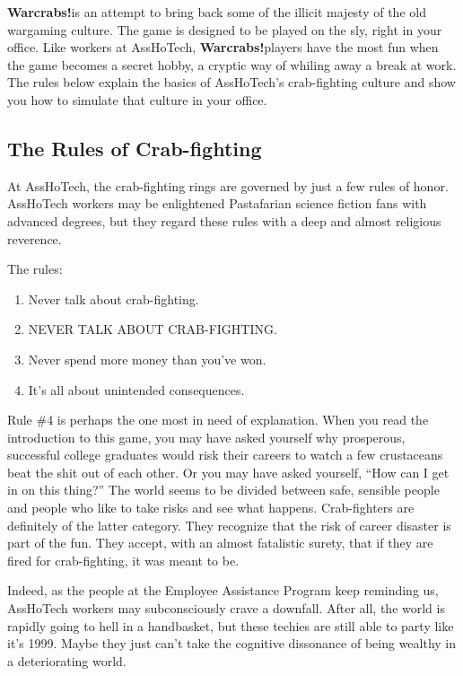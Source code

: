 \documentclass[a4paper,10pt]{article}
\newcommand{\warcrabs}{\textbf{Warcrabs!}}
\begin{document}
\warcrabs\hspace*{4pt}is an attempt to bring back some of the illicit majesty of the old wargaming culture. The game is designed to be played on the sly, right in your office. Like workers at AssHoTech, \warcrabs\hspace*{4pt}players have the most fun when the game becomes a secret hobby, a cryptic way of whiling away a break at work. The rules below explain the basics of AssHoTech's crab-fighting culture and show you how to simulate that culture in your office.

\subsection*{The Rules of Crab-fighting}
\label{sec:TheRulesofCrabfighting}
At AssHoTech, the crab-fighting rings are governed by just a few rules of honor. AssHoTech workers may be enlightened Pastafarian science fiction fans with advanced degrees, but they regard these rules with a deep and almost religious reverence.

The rules:

\begin{enumerate}
 \item Never talk about crab-fighting.
 \item NEVER TALK ABOUT CRAB-FIGHTING.
 \item Never spend more money than you've won.
 \item It's all about unintended consequences.
\end{enumerate}

Rule \#4 is perhaps the one most in need of explanation. When you read the introduction to this game, you may have asked yourself why prosperous, successful college graduates would risk their careers to watch a few crustaceans beat the shit out of each other. Or you may have asked yourself, ``How can I get in on this thing?'' The world seems to be divided between safe, sensible people and people who like to take risks and see what happens. Crab-fighters are definitely of the latter category. They recognize that the risk of career disaster is part of the fun. They accept, with an almost fatalistic surety, that if they are fired for crab-fighting, it was meant to be.

Indeed, as the people at the Employee Assistance Program keep reminding us, AssHoTech workers may subconsciously crave a downfall. After all, the world is rapidly going to hell in a handbasket, but these techies are still able to party like it's 1999. Maybe they just can't take the cognitive dissonance of being wealthy in a deteriorating world.
\end{document}
